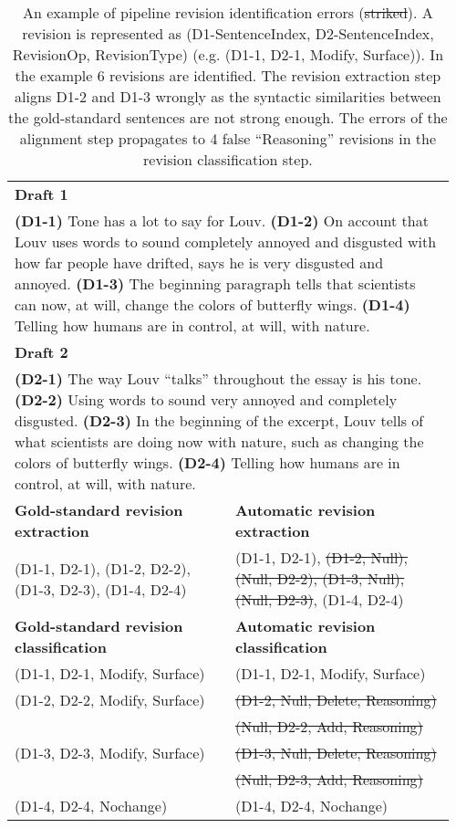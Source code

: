 \documentclass[11pt]{article}
\begin{document}
\begin{table*}
\small
\begin{center}
\begin{tabular} {p{0.48\linewidth}|p{0.48\linewidth}}
\hline 
\multicolumn{2}{l}{\textbf{Draft 1}}\\
\multicolumn{2}{p{0.96\linewidth}}{
\textbf{(D1-1)} Tone has a lot to say for Louv. \textbf{(D1-2)} On account that Louv uses words to sound completely annoyed and disgusted with how far people have drifted, says he is very disgusted and annoyed. \textbf{(D1-3)} The beginning paragraph tells that scientists can now, at will, change the colors of butterfly wings. \textbf{(D1-4)} Telling how humans are in control, at will, with nature.} 
\\
\hline
\multicolumn{2}{l}{\textbf{Draft 2}}\\
\multicolumn{2}{p{0.96\linewidth}}{\textbf{(D2-1)} The way Louv “talks” throughout the essay is his tone. \textbf{(D2-2)} Using words to sound very annoyed and completely disgusted. \textbf{(D2-3)} In the beginning of the excerpt, Louv tells of what scientists are doing now with nature, such as changing the colors of butterfly wings. \textbf{(D2-4)} Telling how humans are in control, at will, with nature.}\\
\hline
\textbf{Gold-standard revision extraction} & \textbf{Automatic revision extraction}\\

(D1-1, D2-1), (D1-2, D2-2), (D1-3, D2-3), (D1-4, D2-4)
&
(D1-1, D2-1), \st{(D1-2, Null), (Null, D2-2), (D1-3, Null), (Null, D2-3)}, (D1-4, D2-4)\\

\textbf{Gold-standard revision classification} & \textbf{Automatic revision classification}\\
(D1-1, D2-1, Modify, Surface) & (D1-1, D2-1, Modify, Surface)\\
(D1-2, D2-2, Modify, Surface) & \st{(D1-2, Null, Delete, Reasoning)} \\
 & \st{(Null, D2-2, Add, Reasoning)} \\
(D1-3, D2-3, Modify, Surface) & \st{(D1-3, Null, Delete, Reasoning)} \\
 & \st{(Null, D2-3, Add, Reasoning)} \\
(D1-4, D2-4, Nochange) & (D1-4, D2-4, Nochange) \\
\hline
\end{tabular}
\end{center}
\caption{An example of pipeline revision identification errors (\st{striked}). A revision is represented as (D1-SentenceIndex, D2-SentenceIndex, RevisionOp, RevisionType) (e.g. (D1-1, D2-1, Modify, Surface)). In the example 6 revisions are identified. The revision extraction step aligns D1-2 and D1-3 wrongly as the syntactic similarities between the gold-standard sentences are not strong enough. The errors of the alignment step propagates to 4 false ``Reasoning'' revisions in the revision classification step.}
\label{table:errorexample}
\end{table*}
\end{document}
